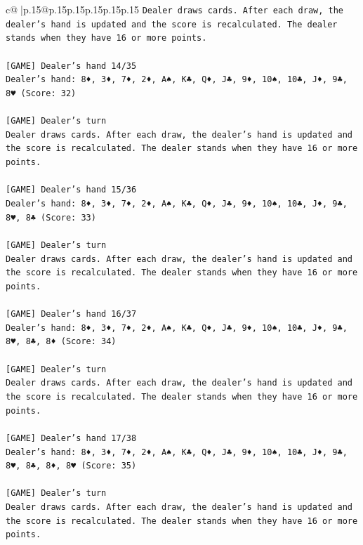 \documentclass{article}
\begin{document}
{\begin{supertabular}{c@{$\;$}|p{.15\linewidth}@{}p{.15\linewidth}p{.15\linewidth}p{.15\linewidth}p{.15\linewidth}p{.15\linewidth}}
{{{\texttt{Dealer draws cards. After each draw, the dealer's hand is updated and the score is recalculated. The dealer stands when they have 16 or more points.} \\
\\ 
\texttt{{[}GAME{]} Dealer's hand 14/35} \\
\texttt{Dealer's hand: 8♦, 3♦, 7♦, 2♦, A♠, K♣, Q♦, J♣, 9♦, 10♠, 10♣, J♦, 9♣, 8♥ (Score: 32)} \\
\\ 
\texttt{{[}GAME{]} Dealer's turn} \\
\texttt{Dealer draws cards. After each draw, the dealer's hand is updated and the score is recalculated. The dealer stands when they have 16 or more points.} \\
\\ 
\texttt{{[}GAME{]} Dealer's hand 15/36} \\
\texttt{Dealer's hand: 8♦, 3♦, 7♦, 2♦, A♠, K♣, Q♦, J♣, 9♦, 10♠, 10♣, J♦, 9♣, 8♥, 8♣ (Score: 33)} \\
\\ 
\texttt{{[}GAME{]} Dealer's turn} \\
\texttt{Dealer draws cards. After each draw, the dealer's hand is updated and the score is recalculated. The dealer stands when they have 16 or more points.} \\
\\ 
\texttt{{[}GAME{]} Dealer's hand 16/37} \\
\texttt{Dealer's hand: 8♦, 3♦, 7♦, 2♦, A♠, K♣, Q♦, J♣, 9♦, 10♠, 10♣, J♦, 9♣, 8♥, 8♣, 8♦ (Score: 34)} \\
\\ 
\texttt{{[}GAME{]} Dealer's turn} \\
\texttt{Dealer draws cards. After each draw, the dealer's hand is updated and the score is recalculated. The dealer stands when they have 16 or more points.} \\
\\ 
\texttt{{[}GAME{]} Dealer's hand 17/38} \\
\texttt{Dealer's hand: 8♦, 3♦, 7♦, 2♦, A♠, K♣, Q♦, J♣, 9♦, 10♠, 10♣, J♦, 9♣, 8♥, 8♣, 8♦, 8♥ (Score: 35)} \\
\\ 
\texttt{{[}GAME{]} Dealer's turn} \\
\texttt{Dealer draws cards. After each draw, the dealer's hand is updated and the score is recalculated. The dealer stands when they have 16 or more points.} \\
\\ 
}}}
\end{supertabular}}
\end{document}
